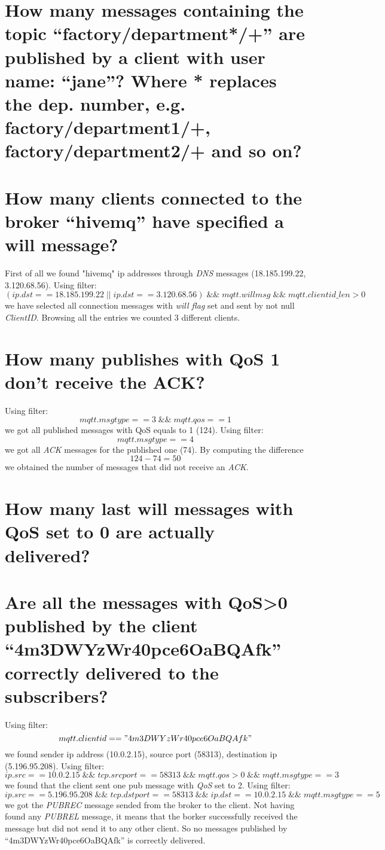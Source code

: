 \documentclass{article}
\begin{document}
\section{How many messages containing the topic
“factory/department*/+” are published by a client with
user name: “jane”? Where * replaces the dep. number,
e.g. factory/department1/+, factory/department2/+
and so on?}

\section{How many clients connected to the broker “hivemq”
have specified a will message?}
First of all we found "hivemq" ip addresses through \textit{DNS} messages (18.185.199.22, 3.120.68.56). Using filter: \[ (ip.dst == 18.185.199.22 \; || \; ip.dst == 3.120.68.56) \; \&\& \; mqtt.willmsg \; \&\& \; mqtt.clientid\_len > 0 \] we have selected
all connection messages with \textit{will flag} set and sent by not null \textit{ClientID}. Browsing all the entries we counted 3 different clients.

\section{How many publishes with QoS 1 don't receive the ACK?}
Using filter: \[ mqtt.msgtype == 3 \; \&\& \; mqtt.qos == 1 \] we got all published messages with QoS equals to 1 (124). \hfill \break
Using filter: \[ mqtt.msgtype == 4 \] we got all \textit{ACK} messages for the published one (74). \hfill \break
By computing the difference \[ 124-74 = 50\] we obtained the number of messages that did not receive an \textit{ACK}.

\section{How many last will messages with QoS set to 0 are
actually delivered?}

\section{Are all the messages with QoS\textgreater  0 published by the
client \break“4m3DWYzWr40pce6OaBQAfk” correctly delivered
to the subscribers?}
Using filter: \[ mqtt.clientid == "4m3DWYzWr40pce6OaBQAfk"\] we found sender ip address (10.0.2.15), source port (58313), destination ip (5.196.95.208). \hfill \break
Using filter: \[ ip.src == 10.0.2.15 \; \&\& \; tcp.srcport == 58313 \; \&\& \; mqtt.qos > 0\; \&\& \; mqtt.msgtype == 3\] we found that the client sent one pub message with \textit{QoS} set to 2. \hfill \break
Using filter: \[ ip.src == 5.196.95.208 \; \&\& \; tcp.dstport == 58313 \; \&\& \; ip.dst == 10.0.2.15 \; \&\& \; mqtt.msgtype == 5\] we got the \textit{PUBREC} message sended from the broker to the client. \hfill \break
Not having found any \textit{PUBREL} message, it means that the borker successfully received the message but did not send it to any other client. So no messages published by “4m3DWYzWr40pce6OaBQAfk” is correctly delivered.
\end{document}

